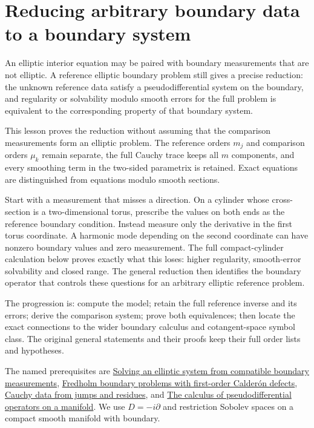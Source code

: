 \documentclass[
  11pt,
]{article}
\author{}
\date{}
\begin{document}
\section{Reducing arbitrary boundary data to a boundary
system}\label{reducing-arbitrary-boundary-data-to-a-boundary-system}

An elliptic interior equation may be paired with boundary measurements
that are not elliptic. A reference elliptic boundary problem still gives
a precise reduction: the unknown reference data satisfy a
pseudodifferential system on the boundary, and regularity or solvability
modulo smooth errors for the full problem is equivalent to the
corresponding property of that boundary system.

This lesson proves the reduction without assuming that the comparison
measurements form an elliptic problem. The reference orders \(m_j\) and
comparison orders \(\mu_k\) remain separate, the full Cauchy trace keeps
all \(m\) components, and every smoothing term in the two-sided
parametrix is retained. Exact equations are distinguished from equations
modulo smooth sections.

Start with a measurement that misses a direction. On a cylinder whose
cross-section is a two-dimensional torus, prescribe the values on both
ends as the reference boundary condition. Instead measure only the
derivative in the first torus coordinate. A harmonic mode depending on
the second coordinate can have nonzero boundary values and zero
measurement. The full compact-cylinder calculation below proves exactly
what this loses: higher regularity, smooth-error solvability and closed
range. The general reduction then identifies the boundary operator that
controls these questions for an arbitrary elliptic reference problem.

The progression is: compute the model; retain the full reference inverse
and its errors; derive the comparison system; prove both equivalences;
then locate the exact connections to the wider boundary calculus and
cotangent-space symbol class. The original general statements and their
proofs keep their full order lists and hypotheses.

The named prerequisites are \href{general-boundary-fredholm.pdf}{Solving
an elliptic system from compatible boundary measurements},
\href{generalized-collar-fredholm.pdf}{Fredholm boundary problems with
first-order Calderón defects}, \href{calderon-cauchy-data.pdf}{Cauchy
data from jumps and residues}, and
\href{geometric-microlocal-calculus.pdf}{The calculus of
pseudodifferential operators on a manifold}. We use \(D=-i\partial\) and
restriction Sobolev spaces on a compact smooth manifold with boundary.
\end{document}
